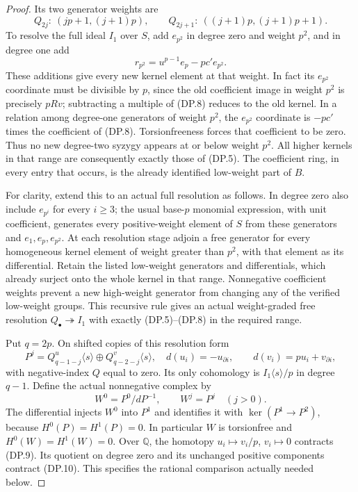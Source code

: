 \begin{proof}
Its two generator weights are
\[
 Q_{2j}:\ (jp+1,(j+1)p),\qquad
 Q_{2j+1}:\ ((j+1)p,(j+1)p+1).                     \tag{DP.7}
\]
To resolve the full ideal $I_1$ over $S$, add
$e_{p^2}$ in degree zero and weight $p^2$, and in degree
one add
\[
                 r_{p^2}=u^{p-1}e_p-pc'e_{p^2}.
 \tag{DP.8}
\]
These additions give every new kernel element at that
weight. In fact its $e_{p^2}$ coordinate must be divisible
by $p$, since the old coefficient image in weight $p^2$
is precisely $pR v$; subtracting a multiple of (DP.8)
reduces to the old kernel. In a relation among degree-one
generators of weight $p^2$, the $e_{p^2}$ coordinate is
$-pc'$ times the coefficient of (DP.8). Torsionfreeness
forces that coefficient to be zero. Thus no new degree-two
syzygy appears at or below weight $p^2$.
All higher kernels in that range are consequently exactly
those of (DP.5). The coefficient ring, in every entry that
occurs, is the already identified low-weight part of $B$.

For clarity, extend this to an actual full resolution as
follows. In degree zero also include $e_{p^i}$ for every
$i\geq3$; the usual base-$p$ monomial expression, with
unit coefficient, generates every positive-weight element
of $S$ from these generators and $e_1,e_p,e_{p^2}$.
At each resolution stage adjoin a free generator for every
homogeneous kernel element of weight greater than $p^2$,
with that element as its differential. Retain the listed
low-weight generators and differentials, which already
surject onto the whole kernel in that range.
Nonnegative coefficient weights prevent a new high-weight
generator from changing any of the verified low-weight
groups. This recursive rule gives an actual weight-graded
free resolution $Q_\bullet\twoheadrightarrow I_1$ with
exactly (DP.5)--(DP.8) in the required range.

Put $q=2p$. On shifted copies of this resolution form
\[
 P^j=Q_{q-1-j}^{u}\langle s\rangle
               \oplus Q_{q-2-j}^{v}\langle s\rangle,
 \quad
 d(u_i)=-u_{\partial i},\qquad
 d(v_i)=p u_i+v_{\partial i},                       \tag{DP.9}
\]
with negative-index $Q$ equal to zero.
Its only cohomology is $I_1\langle s\rangle/p$ in
degree $q-1$. Define the actual nonnegative complex by
\[
 W^0=P^0/dP^{-1},\qquad W^j=P^j\quad(j>0).
 \tag{DP.10}
\]
The differential injects $W^0$ into $P^1$ and identifies
it with $\ker(P^1\to P^2)$, because $H^0(P)=H^1(P)=0$.
In particular $W$ is torsionfree and $H^0(W)=H^1(W)=0$.
Over $\mathbb Q$, the homotopy $u_i\mapsto v_i/p$,
$v_i\mapsto0$ contracts (DP.9). Its quotient on degree
zero and its unchanged positive components contract
(DP.10). This specifies the rational comparison actually
needed below.


\end{proof}
